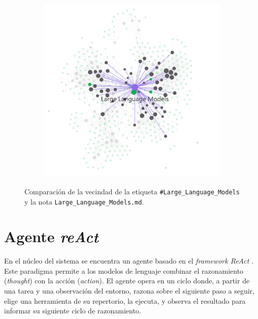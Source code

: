 \begin{figure}[h!]
\begin{subfigure}[b]{0.48\textwidth}
        \includegraphics[width=\textwidth]{figures/LLM_note_graph.png}
        \label{fig:llm_note}
    \end{subfigure}
    \caption{Comparación de la vecindad de la etiqueta \texttt{\#Large\_Language\_Models} y la nota \texttt{Large\_Language\_Models.md}.}
    \label{fig:obsidian_force_graph_example}
\end{figure}

\section{Agente \textit{reAct}}
En el núcleo del sistema se encuentra un agente basado en el \textit{framework ReAct} \parencite{yaoReActSynergizingReasoning2023}. Este paradigma permite a los modelos de lenguaje combinar el razonamiento (\textit{thought}) con la acción (\textit{action}). El agente opera en un ciclo donde, a partir de una tarea y una observación del entorno, razona sobre el siguiente paso a seguir, elige una herramienta de su repertorio, la ejecuta, y observa el resultado para informar su siguiente ciclo de razonamiento.

